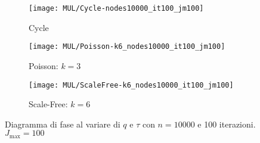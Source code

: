     \begin{figure}[H]
        \begin{minipage}{\linewidth}
            \centering
            \begin{minipage}{0.45\linewidth}
                \begin{figure}
                    \texttt{[image: MUL/Cycle-nodes10000\_it100\_jm100]}\caption{Cycle}
                    \label{fig:mul_cycle_nodes_10000_jm_100}
                \end{figure}
            \end{minipage}
            \hspace{0.05\linewidth}
            \begin{minipage}{0.45\linewidth}
                \begin{figure}
                    \texttt{[image: MUL/Poisson-k6\_nodes10000\_it100\_jm100]}\caption{Poisson: $k=3$}
                    \label{fig:mul_poisson_k_3_nodes_10000_jm_100}
                \end{figure}
            \end{minipage}
            \hspace{0.05\linewidth}
            \begin{minipage}{0.45\linewidth}
                \begin{figure}
                    \texttt{[image: MUL/ScaleFree-k6\_nodes10000\_it100\_jm100]}\caption{Scale-Free: $k=6$}
                    \label{fig:mul_scale_free_k_6_nodes_10000_jm_100}
                \end{figure}
            \end{minipage}
            \caption{Diagramma di fase al variare di $q$ e $\tau$ con $n=10000$ e 100 iterazioni. $J_{\max}=100$}
        \end{minipage}
    \end{figure}
